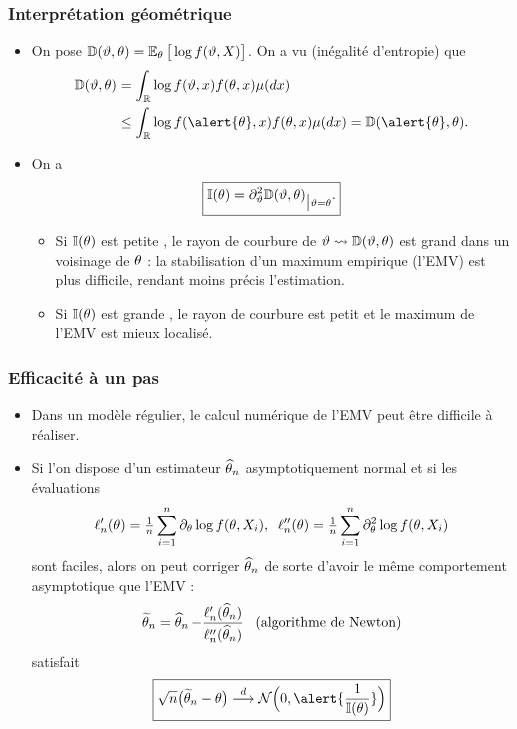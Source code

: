 \begin{frame}
\frametitle{Interprétation géométrique}
\begin{itemize}
\item On pose $\mathbb{D}(\vartheta,\theta)=\operatorname{{\mathbb E}}_\theta\big[\log f(\vartheta,X)\big]$. On a vu (inégalité d'entropie) que
\begin{align*}
\mathbb{D}(\curtheta,\truetheta) & = \int_{\R}\log f(\curtheta,x) f(\truetheta,x)\mu(dx) \\
&  \leq \int_{\R}\log f(\alert{\truetheta}, x) f(\truetheta,x)\mu(dx) = \mathbb{D}(\alert{\truetheta},\truetheta).
\end{align*}
\item On a
$$\boxed{\mathbb{I}(\theta)=\partial_\vartheta^2 \mathbb{D}(\vartheta,\theta)_{\big|\vartheta=\theta}.
}$$
\begin{itemize}
\item Si $\mathbb{I}(\theta)$ est \og petite \fg{}, le \alert{rayon de courbure de $\vartheta \leadsto \mathbb{D}(\vartheta,\theta)$ est grand} dans un voisinage de $\theta$ : la stabilisation d'un maximum empirique (l'EMV) est plus difficile, rendant moins précis l'estimation.
\item Si $\mathbb{I}(\theta)$ est \og grande \fg{}, le \alert{ rayon de courbure est petit} et le maximum de l'EMV est mieux localisé.
 \end{itemize}
\end{itemize}
\end{frame}



\begin{frame}
\frametitle{Efficacité à un pas}
\begin{itemize}
\item Dans un modèle régulier, le \alert{calcul numérique} de l'EMV peut être difficile à réaliser.
\item Si l'on dispose d'un estimateur $\operatorname{\widehat \theta_{\mathnormal{n}}}$ \alert{asymptotiquement normal} et si les évaluations
$$\ell'_n(\theta) = \tfrac{1}{n}\sum_{i = 1}^n \partial_\theta \log f(\theta, X_i),\;\;\ell''_n(\theta)=\tfrac{1}{n}\sum_{i = 1}^n\partial_\theta^2 \log f(\theta, X_i)$$
sont \alert{faciles}, alors on peut \alert{ corriger} $\operatorname{\widehat \theta_{\mathnormal{n}}}$ de sorte d'avoir le même comportement asymptotique que l'EMV :
$$\widetilde {\theta}_n = \operatorname{\widehat \theta_{\mathnormal{n}}} - \frac{\ell'_n(\operatorname{\widehat \theta_{\mathnormal{n}}})}{\ell''_n(\operatorname{\widehat \theta_{\mathnormal{n}}})}\;\;\;\text{(algorithme de Newton)}$$
satisfait
$$\boxed{\sqrt{n}\big(\widetilde \truetheta_n-\truetheta\big) \stackrel{d}{\longrightarrow} {\mathcal N}\Big(0, \alert{\frac{1}{\mathbb{I}(\truetheta)}}\Big)}$$
\end{itemize}
\end{frame}
















